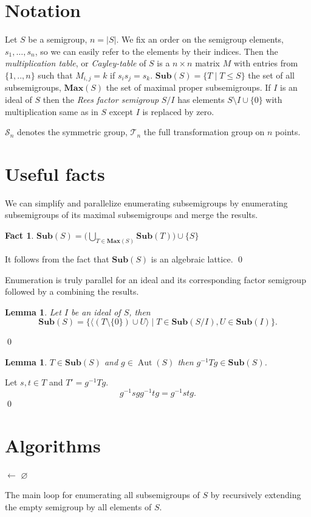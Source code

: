 \documentclass{amsart}
\newcommand{\cT}{{\mathcal T}}
\newcommand{\cS}{{\mathcal S}}
\newcommand{\Sub}{\mathbf{Sub}}
\newcommand{\Max}{\mathbf{Max}}
\DeclareMathOperator{\Aut}{Aut}
\theoremstyle{plain}
\newtheorem{lemma}[theorem]{Lemma}
\newtheorem{fact}[theorem]{Fact}
\theoremstyle{definition}
\begin{document}
\section{Notation}
Let $S$ be a semigroup, $n=|S|$.
We fix an order on the semigroup elements, $s_1,\ldots, s_n$, so we can easily refer to the elements by their indices. 
Then the  \emph{multiplication table}, or \emph{Cayley-table} of $S$ is a $n\times n$ matrix $M$ with entries from $\{1,..,n\}$ such that $M_{i,j}=k$ if $s_is_j=s_k$.
$\Sub(S)=\big\{T\mid T\leq S \big\}$ the set of all subsemigroups, $\Max(S)$ the set of maximal proper subsemigroups.
If $I$ is an ideal of $S$ then the \emph{Rees factor semigroup} $S/I$ has elements $S\setminus I\cup\{0\}$ with multiplication same as in $S$ except $I$ is replaced by zero.

$\cS_n$ denotes the symmetric group, $\cT_n$ the full transformation group on $n$ points.
\section{Useful facts}
We can simplify and parallelize enumerating subsemigroups by enumerating subsemigroups of its maximal subsemigroups and merge the results.
\begin{fact}
$\Sub(S)=\big( \bigcup_{T\in \Max(S)}\Sub(T)\big)\cup \{S\}$
\end{fact}
\proof
It follows from the fact that $\Sub(S)$ is an algebraic lattice.
\qed


Enumeration is truly parallel for an ideal and its corresponding factor semigroup followed by a combining the results.
\begin{lemma}
Let $I$ be an ideal of $S$, then $$\Sub(S)=\big\{\langle (T\setminus\{0\})\cup U \rangle\mid T\in \Sub(S/I), U\in\Sub(I)\big\}.$$
\end{lemma}
\proof

\qed

\begin{lemma}
$T\in\Sub(S)$ and $g\in \Aut(S)$ then $g^{-1}Tg\in\Sub(S)$.
\end{lemma}
\proof
Let $s,t\in T$ and $T'=g^{-1}Tg$.
$$g^{-1}sgg^{-1}tg=g^{-1}stg.$$
\qed




\section{Algorithms}
\begin{algorithm}
\Output{$\Sub(S)$}
\BlankLine
\Name{}

\subs $\leftarrow$ $\varnothing$\;
\Return{\subs}\;
\caption{The main loop for enumerating all subsemigroups of $S$ by recursively extending the empty semigroup by all elements of $S$.}
\label{alg:basicloop}
\end{algorithm}
\end{document}
